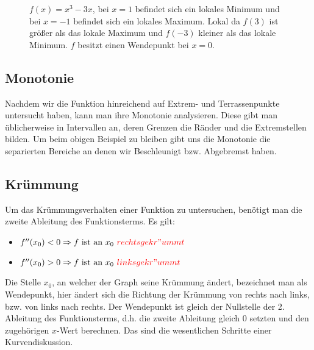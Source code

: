 \begin{figure}[h!]
\begin{center}
\end{center}
\caption{$f(x) = x^3 - 3x$, bei $x=1$ befindet sich ein lokales Minimum und bei $x=-1$ befindet sich ein lokales Maximum. Lokal da $f(3)$ ist größer als das lokale Maximum und $f(-3)$ kleiner als das lokale Minimum. $f$ besitzt einen Wendepunkt bei $x=0$.}
\label{fig:kurvendiss}
\end{figure}

 \subsection{Monotonie}
Nachdem wir die Funktion hinreichend auf Extrem- und Terrassenpunkte untersucht haben, kann man ihre Monotonie analysieren. Diese gibt man üblicherweise in Intervallen an, deren Grenzen die Ränder und die Extremstellen bilden. Um beim obigen Beispiel zu bleiben gibt uns die Monotonie die separierten Bereiche an denen wir Beschleunigt bzw. Abgebremst haben.

\subsection{Krümmung}
Um das Krümmungsverhalten einer Funktion zu untersuchen, benötigt man die zweite Ableitung des Funktionsterms. Es gilt: 
 \begin{itemize}
 \item $f''(x_0)<0 \Rightarrow f \text{ ist an } x_0 \ \textcolor{red}{rechtsgekr"ummt} $
 \item $f''(x_0)>0 \Rightarrow f \text{ ist an } x_0 \ \textcolor{red}{linksgekr"ummt}$
 \end{itemize}
Die Stelle $x_0$, an welcher der Graph seine Krümmung ändert, bezeichnet man als Wendepunkt, hier ändert sich die Richtung der Krümmung von rechts nach links, bzw. von links nach rechts. Der Wendepunkt ist gleich der Nullstelle der 2. Ableitung des Funktionsterms, d.h. die zweite Ableitung gleich $0$ setzten und den zugehörigen $x$-Wert berechnen. Das sind die wesentlichen Schritte einer Kurvendiskussion.


